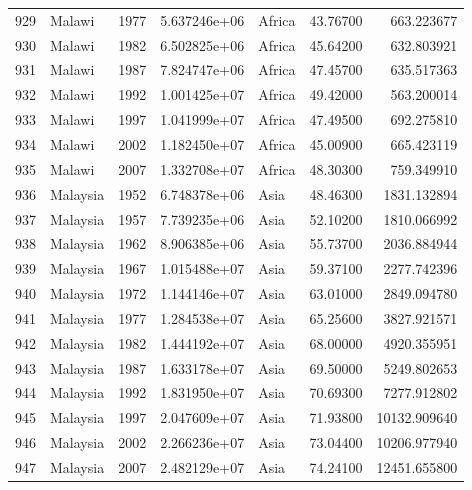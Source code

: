 \documentclass[
  letterpaper,
  DIV=11,
  numbers=noendperiod]{scrreprt}
\begin{document}
\begin{tabular}{llrrlrr}
929  &                    Malawi &  1977 &  5.637246e+06 &    Africa &  43.76700 &     663.223677 \\
930  &                    Malawi &  1982 &  6.502825e+06 &    Africa &  45.64200 &     632.803921 \\
931  &                    Malawi &  1987 &  7.824747e+06 &    Africa &  47.45700 &     635.517363 \\
932  &                    Malawi &  1992 &  1.001425e+07 &    Africa &  49.42000 &     563.200014 \\
933  &                    Malawi &  1997 &  1.041999e+07 &    Africa &  47.49500 &     692.275810 \\
934  &                    Malawi &  2002 &  1.182450e+07 &    Africa &  45.00900 &     665.423119 \\
935  &                    Malawi &  2007 &  1.332708e+07 &    Africa &  48.30300 &     759.349910 \\
936  &                  Malaysia &  1952 &  6.748378e+06 &      Asia &  48.46300 &    1831.132894 \\
937  &                  Malaysia &  1957 &  7.739235e+06 &      Asia &  52.10200 &    1810.066992 \\
938  &                  Malaysia &  1962 &  8.906385e+06 &      Asia &  55.73700 &    2036.884944 \\
939  &                  Malaysia &  1967 &  1.015488e+07 &      Asia &  59.37100 &    2277.742396 \\
940  &                  Malaysia &  1972 &  1.144146e+07 &      Asia &  63.01000 &    2849.094780 \\
941  &                  Malaysia &  1977 &  1.284538e+07 &      Asia &  65.25600 &    3827.921571 \\
942  &                  Malaysia &  1982 &  1.444192e+07 &      Asia &  68.00000 &    4920.355951 \\
943  &                  Malaysia &  1987 &  1.633178e+07 &      Asia &  69.50000 &    5249.802653 \\
944  &                  Malaysia &  1992 &  1.831950e+07 &      Asia &  70.69300 &    7277.912802 \\
945  &                  Malaysia &  1997 &  2.047609e+07 &      Asia &  71.93800 &   10132.909640 \\
946  &                  Malaysia &  2002 &  2.266236e+07 &      Asia &  73.04400 &   10206.977940 \\
947  &                  Malaysia &  2007 &  2.482129e+07 &      Asia &  74.24100 &   12451.655800 \\

\end{tabular}
\end{document}
